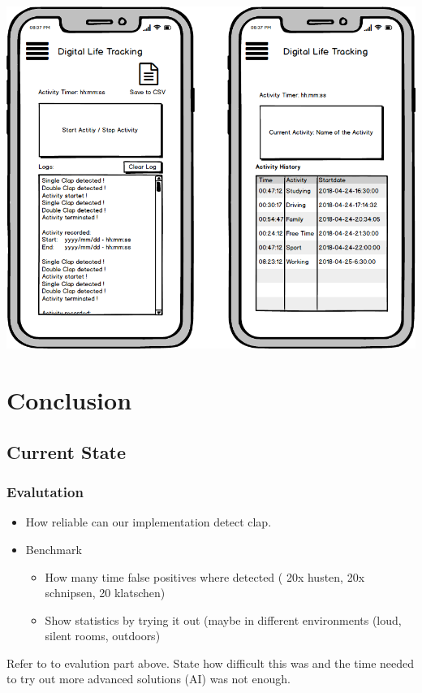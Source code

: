\documentclass
[
 12pt, %
       DIV12,
       a4paper,
       oneside,
       titlepage,
       parskip=half,
       headings=normal,
       listof=totoc,
       bibliography=totoc,
       index=totoc,
       captions=tableheading,
       ]{scrreprt}
\begin{document}
\begin{center}
\includegraphics[width=.9\linewidth]{./imgs/mock.png}
\end{center}

\chapter{Conclusion}
\label{sec:org0929265}
\section{Current State}
\label{sec:org6306cc8}
\subsection{Evalutation}
\label{sec:orgeae9f73}
\begin{itemize}
\item How reliable can our implementation detect clap.
\item Benchmark
\begin{itemize}
\item How many time false positives where detected ( 20x husten, 20x schnipsen, 20 klatschen)
\item Show statistics by trying it out (maybe in different environments (loud,
silent rooms, outdoors)
\end{itemize}
\end{itemize}

Refer to to evalution part above. State how difficult this was and the time
needed to try out more advanced solutions (AI) was not enough.
\end{document}
